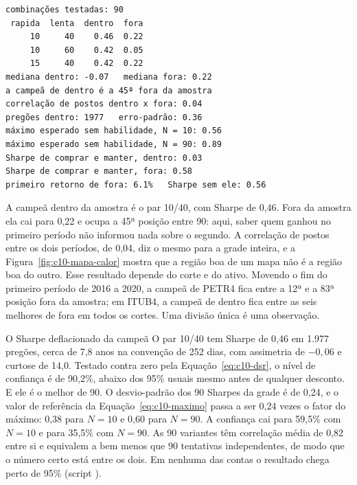 \begin{lstlisting}[style=saida]
combinações testadas: 90
 rapida  lenta  dentro  fora
     10     40    0.46  0.22
     10     60    0.42  0.05
     15     40    0.42  0.22
mediana dentro: -0.07   mediana fora: 0.22
a campeã de dentro é a 45ª fora da amostra
correlação de postos dentro x fora: 0.04
pregões dentro: 1977   erro-padrão: 0.36
máximo esperado sem habilidade, N = 10: 0.56
máximo esperado sem habilidade, N = 90: 0.89
Sharpe de comprar e manter, dentro: 0.03
Sharpe de comprar e manter, fora: 0.58
primeiro retorno de fora: 6.1%   Sharpe sem ele: 0.56
\end{lstlisting}


A campeã dentro da amostra é o par 10/40, com Sharpe de 0,46. Fora da amostra ela cai para 0,22 e ocupa a 45ª posição entre 90: aqui, saber quem ganhou no primeiro período não informou nada sobre o segundo. A correlação de postos entre os dois períodos, de 0,04, diz o mesmo para a grade inteira, e a Figura~\ref{fig:c10-mapa-calor} mostra que a região boa de um mapa não é a região boa do outro. Esse resultado depende do corte e do ativo. Movendo o fim do primeiro período de 2016 a 2020, a campeã de PETR4 fica entre a 12ª e a 83ª posição fora da amostra; em ITUB4, a campeã de dentro fica entre as seis melhores de fora em todos os cortes. Uma divisão única é uma observação.

\begin{exemplo}{O Sharpe deflacionado da campeã}
O par 10/40 tem Sharpe de 0,46 em 1.977 pregões, cerca de 7,8 anos na convenção de 252 dias, com assimetria de $-0,06$ e curtose de 14,0. Testado contra zero pela Equação~\eqref{eq:c10-dsr}, o nível de confiança é de 90,2\%, abaixo dos 95\% usuais mesmo antes de qualquer desconto. E ele é o melhor de 90. O desvio-padrão dos 90 Sharpes da grade é de 0,24, e o valor de referência da Equação~\eqref{eq:c10-maximo} passa a ser 0,24 vezes o fator do máximo: 0,38 para $N = 10$ e 0,60 para $N = 90$. A confiança cai para 59,5\% com $N = 10$ e para 35,5\% com $N = 90$. As 90 variantes têm correlação média de 0,82 entre si e equivalem a bem menos que 90 tentativas independentes, de modo que o número certo está entre os dois. Em nenhuma das contas o resultado chega perto de 95\% (script ).
\end{exemplo}

